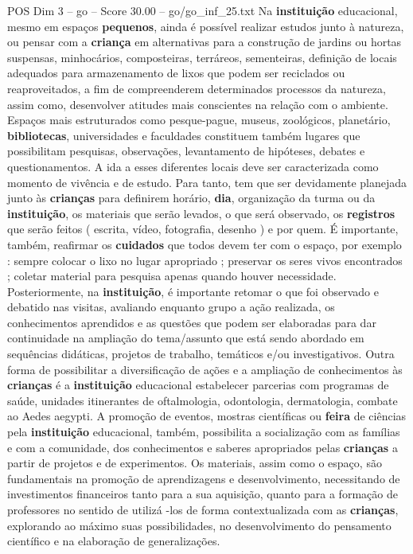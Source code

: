\begin{textsample}{POS Dim 3 – go – Score 30.00 – go/go\_inf\_25.txt}
Na \textbf{instituição} educacional, mesmo em espaços \textbf{pequenos}, ainda é possível realizar estudos junto à natureza, ou pensar com a \textbf{criança} em alternativas para a construção de jardins ou hortas suspensas, minhocários, composteiras, terráreos, sementeiras, definição de locais adequados para armazenamento de lixos que podem ser reciclados ou reaproveitados, a fim de compreenderem determinados processos da natureza, assim como, desenvolver atitudes mais conscientes na relação com o ambiente.
Espaços mais estruturados como pesque-pague, museus, zoológicos, planetário, \textbf{bibliotecas}, universidades e faculdades constituem também lugares que possibilitam pesquisas, observações, levantamento de hipóteses, debates e questionamentos.
A ida a esses diferentes locais deve ser caracterizada como momento de vivência e de estudo.
Para tanto, tem que ser devidamente planejada junto às \textbf{crianças} para definirem horário, \textbf{dia}, organização da turma ou da \textbf{instituição}, os materiais que serão levados, o que será observado, os \textbf{registros} que serão feitos ( escrita, vídeo, fotografia, desenho ) e por quem.
É importante, também, reafirmar os \textbf{cuidados} que todos devem ter com o espaço, por exemplo : sempre colocar o lixo no lugar apropriado ; preservar os seres vivos encontrados ; coletar material para pesquisa apenas quando houver necessidade.
Posteriormente, na \textbf{instituição}, é importante retomar o que foi observado e debatido nas visitas, avaliando enquanto grupo a ação realizada, os conhecimentos aprendidos e as questões que podem ser elaboradas para dar continuidade na ampliação do tema/assunto que está sendo abordado em sequências didáticas, projetos de trabalho, temáticos e/ou investigativos.
Outra forma de possibilitar a diversificação de ações e a ampliação de conhecimentos às \textbf{crianças} é a \textbf{instituição} educacional estabelecer parcerias com programas de saúde, unidades itinerantes de oftalmologia, odontologia, dermatologia, combate ao Aedes aegypti.
A promoção de eventos, mostras científicas ou \textbf{feira} de ciências pela \textbf{instituição} educacional, também, possibilita a socialização com as famílias e com a comunidade, dos conhecimentos e saberes apropriados pelas \textbf{crianças} a partir de projetos e de experimentos.
Os materiais, assim como o espaço, são fundamentais na promoção de aprendizagens e desenvolvimento, necessitando de investimentos financeiros tanto para a sua aquisição, quanto para a formação de professores no sentido de utilizá -los de forma contextualizada com as \textbf{crianças}, explorando ao máximo suas possibilidades, no desenvolvimento do pensamento científico e na elaboração de generalizações.

\end{textsample}
